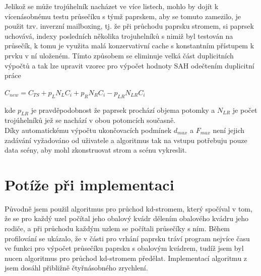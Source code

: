 \documentclass[report,11pt]{elsarticle}
\begin{document}
Jelikož se může trojúhelník nacházet ve více listech, mohlo by dojít k vícenásobnému testu průsečíku s týmž paprskem, aby se tomuto zamezilo, je použit tzv. inverzní mailboxing, tj. že při průchodu paprsku stromem, si paprsek uchovává, indexy posledních několika trojuhelníků s nimiž byl testován na průsečík, k tomu je využita malá konzervativní cache s konstantním přístupem k prvku v ní uloženém. Tímto způsobem se eliminuje velká část duplicitních výpočtů a tak lze upravit vzorec pro výpočet hodnoty SAH odečtením duplicitní práce \cite{Mailbox}
\begin{center}
$C_{new}=C_{TS}+p_LN_LC_i+p_RN_RC_i-p_{LR}N_{LR}C_i$
\end{center}
kde $p_{LR}$ je pravděpodobnost že paprsek prochází objema potomky a $N_{LR}$ je počet trojúhelníků jež se nachází v obou potomcích současně.\\

Díky automatickému výpočtu ukončovacích podmínek $d_{max}$ a $F_{max}$ není jejich zadávání vyžadováno od uživatele a algoritmus tak na vstupu potřebuju pouze data scény, aby mohl zkonstruovat strom a scénu vykreslit.









%


\section{\label{SEC:Pitfalls}Potíže při implementaci}

Původně jsem použil algoritmus pro průchod kd-stromem, který spočíval v tom, že se pro každý uzel počítal jeho obalový kvádr dělením obalového kvádru jeho rodiče, a při průchodu každým uzlem se počítali průsečíky s ním. Během profilování se ukázalo, že v části pro vrhání paprsku tráví program nejvíce času ve funkci pro výpočet průsečíku paprsku s obalovým kvádrem, tudíž jsem byl nucen algoritmus pro průchod kd-stromem předělat. Implementací algoritmu z \cite{Havran} jsem dosáhl přibližně čtyřnásobného zrychlení.
\end{document}
